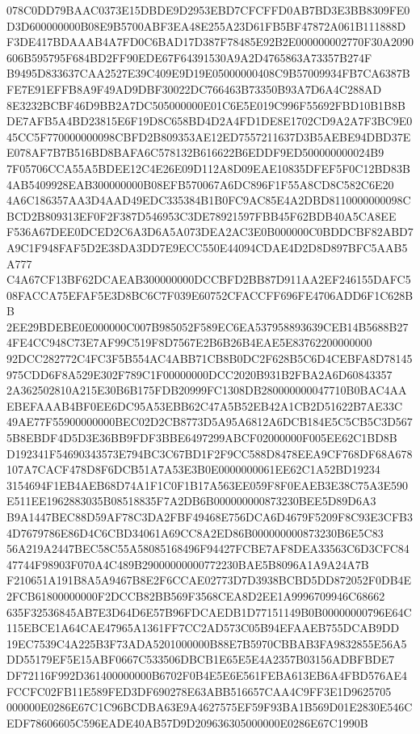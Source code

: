 \documentclass[UTF8,fontset=fandol,zihao=-4,a4paper]{ctexart}
\begin{document}
{{078C0DD79BAAC0373E15DBDE9D2953EBD7CFCFFD0AB7BD3E3BB8309FE0D3D600000000B08E9B5700ABF3EA48E255A23D61FB5BF47872A061B111888D
F3DE417BDAAAB4A7FD0C6BAD17D387F78485E92B2E000000002770F30A2090606B595795F684BD2FF90EDE67F64391530A9A2D4765863A73357B274F
B9495D833637CAA2527E39C409E9D19E05000000408C9B57009934FB7CA6387BFE7E91EFFB8A9F49AD9DBF30022DC766463B73350B93A7D6A4C288AD
8E3232BCBF46D9BB2A7DC505000000E01C6E5E019C996F55692FBD10B1B8BDE7AFB5A4BD23815E6F19D8C658BD4D2A4FD1DE8E1702CD9A2A7F3BC9E0
45CC5F770000000098CBFD2B809353AE12ED7557211637D3B5AEBE94DBD37EE078AF7B7B516BD8BAFA6C578132B616622B6EDDF9ED500000000024B9
7F05706CCA55A5BDEE12C4E26E09D112A8D09EAE10835DFEF5F0C12BD83B4AB5409928EAB300000000B08EFB570067A6DC896F1F55A8CD8C582C6E20
4A6C186357AA3D4AAD49EDC335384B1B0FC9AC85E4A2DBD8110000000098CBCD2B809313EF0F2F387D546953C3DE78921597FBB45F62BDB40A5CA8EE
F536A67DEE0DCED2C6A3D6A5A073DEA2AC3E0B000000C0BDDCBF82ABD7A9C1F948FAF5D2E38DA3DD7E9ECC550E44094CDAE4D2D8D897BFC5AAB5A777
C4A67CF13BF62DCAEAB300000000DCCBFD2BB87D911AA2EF246155DAFC508FACCA75EFAF5E3D8BC6C7F039E60752CFACCFF696FE4706ADD6F1C628BB
2EE29BDEBE0E000000C007B985052F589EC6EA537958893639CEB14B5688B274FE4CC948C73E7AF99C519F8D7567E2B6B26B4EAE5E83762200000000
92DCC282772C4FC3F5B554AC4ABB71CB8B0DC2F628B5C6D4CEBFA8D78145975CDD6F8A529E302F789C1F00000000DCC2020B931B2FBA2A6D60843357
2A362502810A215E30B6B175FDB20999FC1308DB280000000047710B0BAC4AAEBEFAAAB4BF0EE6DC95A53EBB62C47A5B52EB42A1CB2D51622B7AE33C
49AE77F55900000000BEC02D2CB8773D5A95A6812A6DCB184E5C5CB5C3D5675B8EBDF4D5D3E36BB9FDF3BBE6497299ABCF02000000F005EE62C1BD8B
D192341F54690343573E794BC3C67BD1F2F9CC588D8478EEA9CF768DF68A678107A7CACF478D8F6DCB51A7A53E3B0E0000000061EE62C1A52BD19234
3154694F1EB4AEB68D74A1F1C0F1B17A563EE059F8F0EAEB3E38C75A3E590E511EE1962883035B08518835F7A2DB6B000000000873230BEE5D89D6A3
B9A1447BEC88D59AF78C3DA2FBF49468E756DCA6D4679F5209F8C93E3CFB34D7679786E86D4C6CBD34061A69CC8A2ED86B000000000873230B6E5C83
56A219A2447BEC58C55A58085168496F94427FCBE7AF8DEA33563C6D3CFC8447744F98903F070A4C489B29000000000772230BAE5B8096A1A9A24A7B
F210651A191B8A5A9467B8E2F6CCAE02773D7D3938BCBD5DD872052F0DB4E2FCB61800000000F2DCCB82BB569F3568CEA8D2EE1A9996709946C68662
635F32536845AB7E3D64D6E57B96FDCAEDB1D77151149B0B00000000796E64C115EBCE1A64CAE47965A1361FF7CC2AD573C05B94EFAAEB755DCAB9DD
19EC7539C4A225B3F73ADA5201000000B88E7B5970CBBAB3FA9832855E56A5DD55179EF5E15ABF0667C533506DBCB1E65E5E4A2357B03156ADBFBDE7
DF72116F992D361400000000B6702F0B4E5E6E561FEBA613EB6A4FBD576AE4FCCFC02FB11E589FED3DF690278E63ABB516657CAA4C9FF3E1D9625705
000000E0286E67C1C96BCDBA63E9A4627575EF59F93BA1B569D01E2830E546CEDF78606605C596EADE40AB57D9D209636305000000E0286E67C1990B
}}
\end{document}
